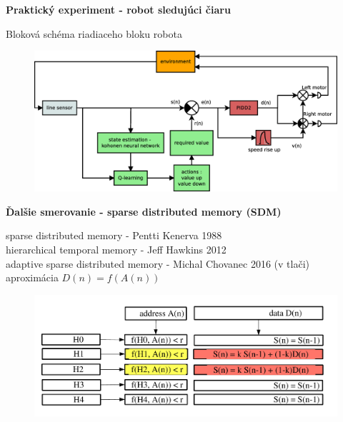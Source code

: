 \documentclass[xcolor=dvipsnames]{beamer}
\begin{document}
\begin{frame}{\bf Praktický experiment - robot sledujúci čiaru}

Bloková schéma riadiaceho bloku robota

\begin{figure}[!htb]
\centering
\includegraphics[scale=.2]{../diagrams/motoko_robot_block.eps}
\label{img:motoko_robot_block}
\end{figure}

\end{frame}

\begin{frame}{\bf Ďalšie smerovanie - sparse distributed memory (SDM)}

sparse distributed memory - Pentti Kenerva 1988 \\
hierarchical temporal memory - Jeff Hawkins 2012 \\
adaptive sparse distributed memory - Michal Chovanec 2016 (v tlači) \\
\bigskip
aproximácia
$D(n) = f( A(n) )$
\begin{figure}[!htb]
\centering
\includegraphics[scale=.4]{../pictures/sdm.pdf}
\label{img:motoko_robot_block}
\end{figure}
\end{frame}
\end{document}

